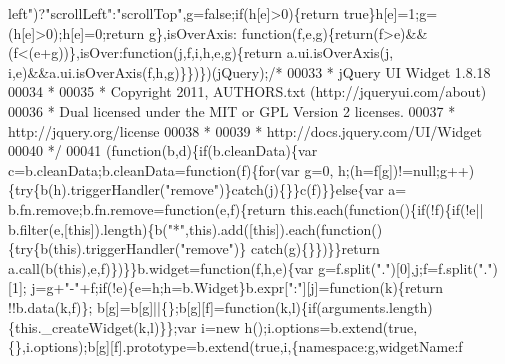 \begin{DoxyCode}
{      left"})?\textcolor{stringliteral}{"scrollLeft"}:\textcolor{stringliteral}{"scrollTop"},g=\textcolor{keyword}{false};\textcolor{keywordflow}{if}(h[e]>0)\{return true\}h[e]=1;g=(h[e]>0);h[e]=0;\textcolor{keywordflow}{return} g\},isOverAxis:\textcolor{keyword}{
      function}(f,e,g)\{\textcolor{keywordflow}{return}(f>e)&&(f<(e+g))\},isOver:\textcolor{keyword}{function}(j,f,i,h,e,g)\{\textcolor{keywordflow}{return} a.ui.isOverAxis(j,
      i,e)&&a.ui.isOverAxis(f,h,g)\}\})\})(jQuery);\textcolor{comment}{/*}
00033 \textcolor{comment}{ * jQuery UI Widget 1.8.18}
00034 \textcolor{comment}{ *}
00035 \textcolor{comment}{ * Copyright 2011, AUTHORS.txt (http://jqueryui.com/about)}
00036 \textcolor{comment}{ * Dual licensed under the MIT or GPL Version 2 licenses.}
00037 \textcolor{comment}{ * http://jquery.org/license}
00038 \textcolor{comment}{ *}
00039 \textcolor{comment}{ * http://docs.jquery.com/UI/Widget}
00040 \textcolor{comment}{ */}
00041 (\textcolor{keyword}{function}(b,d)\{\textcolor{keywordflow}{if}(b.cleanData)\{var c=b.cleanData;b.cleanData=\textcolor{keyword}{function}(f)\{\textcolor{keywordflow}{for}(var g=0,
      h;(h=f[g])!=null;g++)\{\textcolor{keywordflow}{try}\{b(h).triggerHandler(\textcolor{stringliteral}{"remove"})\}\textcolor{keywordflow}{catch}(j)\{\}\}c(f)\}\}\textcolor{keywordflow}{else}\{var a=
      b.fn.remove;b.fn.remove=\textcolor{keyword}{function}(e,f)\{\textcolor{keywordflow}{return} this.each(\textcolor{keyword}{function}()\{\textcolor{keywordflow}{if}(!f)\{\textcolor{keywordflow}{if}(!e||
      b.filter(e,[\textcolor{keyword}{this}]).length)\{b(\textcolor{stringliteral}{"*"},\textcolor{keyword}{this}).add([\textcolor{keyword}{this}]).each(\textcolor{keyword}{function}()\{\textcolor{keywordflow}{try}\{b(\textcolor{keyword}{this}).triggerHandler(\textcolor{stringliteral}{"remove"})\}\textcolor{keywordflow}{
      catch}(g)\{\}\})\}\}\textcolor{keywordflow}{return} a.call(b(\textcolor{keyword}{this}),e,f)\})\}\}b.widget=\textcolor{keyword}{function}(f,h,e)\{var g=f.split(\textcolor{stringliteral}{"."})[0],j;f=f.split(\textcolor{stringliteral}{"."})[1];
      j=g+\textcolor{stringliteral}{"-"}+f;\textcolor{keywordflow}{if}(!e)\{e=h;h=b.Widget\}b.expr[\textcolor{stringliteral}{":"}][j]=\textcolor{keyword}{function}(k)\{\textcolor{keywordflow}{return} !!b.data(k,f)\};
      b[g]=b[g]||\{\};b[g][f]=\textcolor{keyword}{function}(k,l)\{\textcolor{keywordflow}{if}(arguments.length)\{this.\_createWidget(k,l)\}\};var 
      i=\textcolor{keyword}{new} h();i.options=b.extend(\textcolor{keyword}{true},\{\},i.options);b[g][f].prototype=b.extend(\textcolor{keyword}{true},i,\{\textcolor{keyword}{namespace}:g,widgetName:f

\end{DoxyCode}

